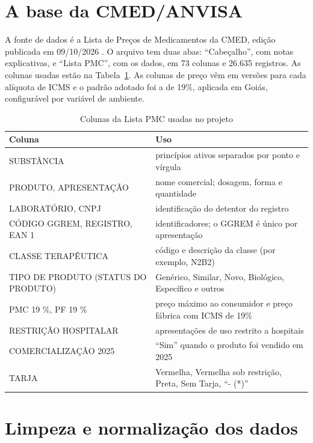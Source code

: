 \documentclass[12pt,oneside,a4paper,english,brazil]{abntex2}
\begin{document}
\section{A base da CMED/ANVISA}

A fonte de dados é a Lista de Preços de Medicamentos da CMED, edição publicada em 09/10/2026 \cite{cmed2026}. O arquivo tem duas abas: ``Cabeçalho'', com notas explicativas, e ``Lista PMC'', com os dados, em 73 colunas e 26.635 registros. As colunas usadas estão na Tabela~\ref{tab:colunas}. As colunas de preço vêm em versões para cada alíquota de ICMS e o padrão adotado foi a de 19\%, aplicada em Goiás, configurável por variável de ambiente.

\begin{table}[htb]
  \centering
  \caption{Colunas da Lista PMC usadas no projeto}
  \label{tab:colunas}
  \footnotesize
  \begin{tabular}{|p{5.2cm}|p{8.8cm}|}
    \hline
    \textbf{Coluna} & \textbf{Uso} \\ \hline
    SUBSTÂNCIA & princípios ativos separados por ponto e vírgula \\ \hline
    PRODUTO, APRESENTAÇÃO & nome comercial; dosagem, forma e quantidade \\ \hline
    LABORATÓRIO, CNPJ & identificação do detentor do registro \\ \hline
    CÓDIGO GGREM, REGISTRO, EAN 1 & identificadores; o GGREM é único por apresentação \\ \hline
    CLASSE TERAPÊUTICA & código e descrição da classe (por exemplo, N2B2) \\ \hline
    TIPO DE PRODUTO (STATUS DO PRODUTO) & Genérico, Similar, Novo, Biológico, Específico e outros \\ \hline
    PMC 19 \%, PF 19 \% & preço máximo ao consumidor e preço fábrica com ICMS de 19\% \\ \hline
    RESTRIÇÃO HOSPITALAR & apresentações de uso restrito a hospitais \\ \hline
    COMERCIALIZAÇÃO 2025 & ``Sim'' quando o produto foi vendido em 2025 \\ \hline
    TARJA & Vermelha, Vermelha sob restrição, Preta, Sem Tarja, ``- (*)'' \\ \hline
  \end{tabular}
\end{table}

\section{Limpeza e normalização dos dados}
\end{document}
